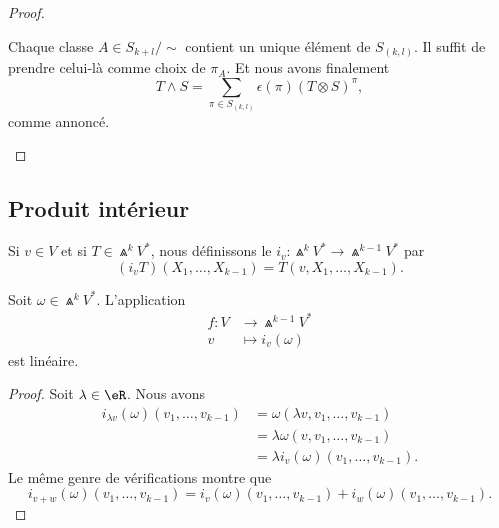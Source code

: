 \begin{proof}
\begin{subproof}
		\spitem[Conclusion]
		Chaque classe \( A\in S_{k+l}/\sim\) contient un unique élément de \( S_{(k,l)}\). Il suffit de prendre celui-là comme choix de \( \pi_A\). Et nous avons finalement
		\begin{equation}
			T\wedge S=\sum_{\pi\in S_{(k,l)}}\epsilon(\pi)(T\otimes S)^{\pi},
		\end{equation}
		comme annoncé.
	\end{subproof}
\end{proof}


\subsection{Produit intérieur}

\begin{definition}		\label{DEFooFWIHooJiTnwM}
	Si \( v\in V\) et si \( T\in\Wedge^kV^*\), nous définissons le  \(i_v \colon \Wedge^kV^*\to \Wedge^{k-1}V^*  \) par
	\begin{equation}
		(i_vT)(X_1,\ldots,X_{k-1})=T(v,X_1,\ldots,X_{k-1}).
	\end{equation}
\end{definition}

\begin{proposition}			\label{PROPooETGJooMjxAFp}
	Soit \( \omega\in \Wedge^k V^*\). L'application
	\begin{equation}
		\begin{aligned}
			f\colon V & \to \Wedge^{k-1}V^* \\
			v         & \mapsto i_v(\omega)
		\end{aligned}
	\end{equation}
	est linéaire.
\end{proposition}

\begin{proof}
	Soit \( \lambda\in \eR\). Nous avons
	\begin{subequations}
		\begin{align}
			i_{\lambda v}(\omega)(v_1,\ldots,v_{k-1}) & = \omega(\lambda v, v_1,\ldots,v_{k-1})   \\
			                                          & =\lambda\omega(v,v_1,\ldots,v_{k-1})      \\
			                                          & =\lambda i_v(\omega)(v_1,\ldots,v_{k-1}).
		\end{align}
	\end{subequations}
	Le même genre de vérifications montre que
	\begin{equation}
		i_{v+w}(\omega)(v_1,\ldots,v_{k-1})=i_v(\omega)(v_1,\ldots,v_{k-1})+i_w(\omega)(v_1,\ldots,v_{k-1}).
	\end{equation}
\end{proof}

